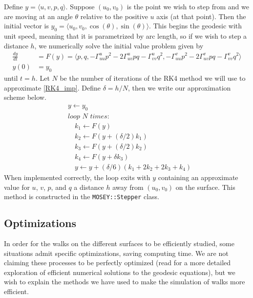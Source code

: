 \documentclass[12pt]{article}
\begin{document}
		Define $y = \langle u , v , p , q \rangle$.
		Suppose $(u_0,v_0)$ is the point we wish to step from and we are moving at an angle $\theta$ relative to the positive $u$ axis (at that point).
		Then the initial vector is $y_0 = \langle u_0 , v_0 , \cos(\theta) , \sin(\theta) \rangle$.
		This begins the geodesic with unit speed, meaning that it is parametrized by arc length, so if we wish to step a distance $h$, we numerically solve the initial value problem given by
		\begin{equation} \label{RK4_imp} \begin{split}
			\frac{dy}{dt} & = F(y) = \langle p , q , -\Gamma^u_{uu}p^2-2\Gamma^u_{uv}pq-\Gamma^u_{vv}q^2 , -\Gamma^v_{uu}p^2-2\Gamma^v_{uv}pq-\Gamma^v_{vv}q^2 \rangle \\
			y(0) & = y_0
		\end{split} \end{equation}
		until $t = h$.
		Let $N$ be the number of iterations of the RK4 method we will use to approximate \ref{RK4_imp}.
		Define $\delta = h/N$, then we write our approximation scheme below.
		\begin{equation} \label{RK4_alg} \begin{split}
			& y \gets y_0 \\
			& \textit{loop } N \textit{ times:} \\
			& \quad k_1 \gets F(y) \\
			& \quad k_2 \gets F\left(y+(\delta/2)k_1\right) \\
			& \quad k_3 \gets F\left(y+(\delta/2)k_2\right) \\
			& \quad k_4 \gets F\left(y + \delta k_3\right) \\
			& \quad y \gets y+(\delta/6)(k_1+2k_2+2k_3+k_4)
		\end{split} \end{equation}
		When implemented correctly, the loop exits with $y$ containing an approximate value for $u$, $v$, $p$, and $q$ a distance $h$ away from $(u_0, v_0)$ on the surface.
		This method is constructed in the \texttt{MOSEY::Stepper} class.
		
	\subsection{Optimizations}
		In order for the walks on the different surfaces to be efficiently studied, some situations admit specific optimizations, saving computing time.
		We are not claiming these processes to be perfectly optimized (read \cite{Redfield_NumericalGeodesics_2007} for a more detailed exploration of efficient numerical solutions to the geodesic equations), but we wish to explain the methods we have used to make the simulation of walks more efficient.
		
\end{document}
